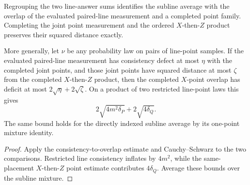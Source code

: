 \begin{lemma}
	\label{lem:qld-x-point-overlap-deficit}
	\leanok
	Regrouping the two line-answer sums identifies the subline average with the
	overlap of the evaluated paired-line measurement and a completed point
	family. Completing the joint point measurement and the ordered
	$X$-then-$Z$ product preserves their squared distance exactly.

	More generally, let $\nu$ be any probability law on pairs of line-point
	samples. If the evaluated paired-line measurement has consistency defect at
	most $\eta$ with the completed joint points, and those joint points have
	squared distance at most $\zeta$ from the completed $X$-then-$Z$ product,
	then the completed $X$-point overlap has deficit at most
	$2\sqrt\eta+2\sqrt\zeta$. On a product of two restricted line-point laws this
	gives
	\[
		2\sqrt{4m^2\delta_P}+2\sqrt{4\delta_Q}.
	\]
	The same bound holds for the directly indexed subline average by its
	one-point mixture identity.
\end{lemma}
\begin{proof}
	\leanok
	Apply the consistency-to-overlap estimate and Cauchy--Schwarz to the two
	comparisons. Restricted line consistency inflates by $4m^2$, while the
	same-placement $X$-then-$Z$ point estimate contributes $4\delta_Q$.
	Average these bounds over the subline mixture.
\end{proof}

